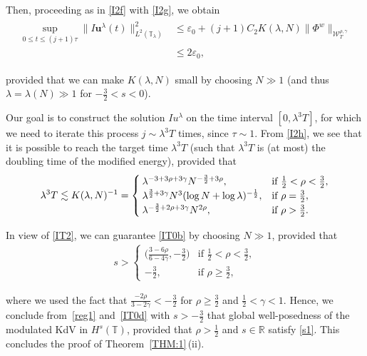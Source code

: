 \documentclass[letterpaper, 11pt,  reqno]{amsart}
\newcommand{\1}{\hspace{0.5mm}\text{I}\hspace{0.5mm}}
\newcommand{\noi}{\noindent}
\newcommand{\R}{\mathbb{R}}
\newcommand{\T}{\mathbb{T}}
\newcommand{\eps}{\varepsilon}
\newcommand{\g}{\gamma}
\newcommand{\ld}{\lambda}
\newcommand{\les}{\lesssim}
\newcommand{\W}{\mathcal{W}}
\newcommand{\uu}{\mathbf{u}}
\numberwithin{equation}{section}
\numberwithin{theorem}{section}
\begin{document}
\noi
Then, proceeding as in \eqref{I2f} with \eqref{I2g}, we obtain
\begin{align}
\begin{split}
 \sup_{0 \le t\le(j+1) \tau} \| I \uu^\ld(t) \|^2_{L^2(\T_\ld)} 
&  \le \eps_0 + 
(j+1) C_2 K(\ld, N)   \|  \Phi^{w}  \|_{\W_{T}^{\rho, \g}}   \\
&  \le 2\eps_0, 
\end{split}
\label{I2h}
\end{align}


\noi
provided that 
we can make 
 $K(\ld, N)$  small by 
choosing $N \gg 1$
(and thus $\ld = \ld(N) \gg1$
for $- \frac 32 < s < 0$).


Our goal is to construct the solution $Iu^\ld$ on the time interval $[0, \ld^3 T]$, 
for which we need to iterate this process $j \sim \ld^3 T$ times, 
since  $\tau \sim1$.
From \eqref{I2h}, 
we see that 
 it is possible 
to reach the target time $\ld^3 T$
(such that $\ld^3T$ is (at most) the doubling time
of the modified energy), 
provided that 
\begin{align}
\ld^3T\les  K(\ld, N)^{-1}
= \begin{cases}
\ld^{- 3+ 3\rho+3\g} N^{-\frac 32 + 3\rho}, & \text{if $\frac 12 < \rho < \frac 32$}, \\
\ld^{\frac 32 + 3\g} N^{3} (\log N + \log \ld)^{-\frac 12}, & \text{if $\rho =  \frac 32$}, \\
\ld^{ -\frac 32 + 2\rho +3\g} N^{2\rho}, & \text{if $ \rho >  \frac 32$}.
\end{cases}
\label{IT0b}
\end{align}







\noi
In view of  \eqref{IT2}, 
we  can  guarantee \eqref{IT0b} by choosing $N \gg 1$, 
provided that 
\begin{align}
s > 
\begin{cases}
\big(\frac {3-6\rho }{6 - 4\g}, - \frac 32\big)& \text{if } \frac 12 < \rho < \frac 32, \\
- \frac 32, & \text{if }  \rho \ge \frac 32, 
\end{cases}
\label{IT0d}
\end{align}

\noi
where we used the fact that 
$\frac{-2\rho}{3 - 2\g}  < -\frac 32$ for 
 $\rho \ge \frac 32$ and
$ \frac 12< \g < 1$.
Hence, 
we conclude 
from~\eqref{reg1} and~\eqref{IT0d} with $ s > - \frac 32$
that 
global well-posedness of the modulated KdV in $H^s(\T)$, 
provided that 
$\rho > \frac 12$ and $s\in \R$
satisfy \eqref{s1}.
This concludes the proof of Theorem~\ref{THM:1}\,(ii).
\end{document}
